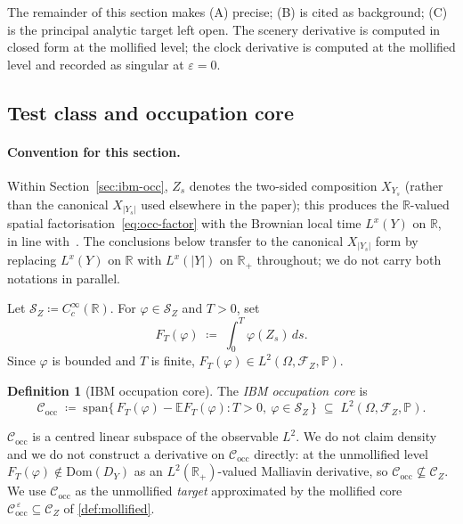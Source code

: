 \documentclass[11pt,reqno]{amsart}
\theoremstyle{plain}
\theoremstyle{definition}
\newtheorem{definition}[theorem]{Definition}
\theoremstyle{remark}
\newcommand{\R}{\mathbb{R}}
\newcommand{\E}{\mathbb{E}}
\newcommand{\Prob}{\mathbb{P}}
\newcommand{\Dom}{\mathrm{Dom}}
\newcommand{\IBM}{Z}
\begin{document}
The remainder of this section makes (A) precise; (B) is cited as
background; (C) is the principal analytic target left open. The
scenery derivative is computed in closed form at the mollified level;
the clock derivative is computed at the mollified level and recorded
as singular at $\varepsilon=0$.

\subsection*{Test class and occupation core}

\paragraph{Convention for this section.}
Within Section~\ref{sec:ibm-occ}, $\IBM_s$ denotes the two-sided
composition $X_{Y_s}$ (rather than the canonical
$X_{|Y_s|}$ used elsewhere in the paper); this produces the
$\R$-valued spatial factorisation~\eqref{eq:occ-factor} with the
Brownian local time $L^{x}(Y)$ on $\R$, in line
with~\cite{Fontes-IBMchaos}. The conclusions below transfer to the
canonical $X_{|Y_s|}$ form by replacing $L^{x}(Y)$ on $\R$ with
$L^{x}(|Y|)$ on $\R_{+}$ throughout; we do not carry both notations
in parallel.

Let $\mathscr S_\IBM\coloneqq C_c^{\infty}(\R)$. For
$\varphi\in\mathscr S_\IBM$ and $T>0$, set
\[
  F_T(\varphi)\;\coloneqq\;\int_0^T\varphi(\IBM_s)\,ds.
\]
Since $\varphi$ is bounded and $T$ is finite,
$F_T(\varphi)\in L^{2}(\Omega,\mathcal F_\IBM,\Prob)$.

\begin{definition}[IBM occupation core]\label{def:cocc}
The \emph{IBM occupation core} is
\[
  \mathcal C_{\mathrm{occ}}
  \;\coloneqq\;\mathrm{span}\bigl\{\,F_T(\varphi)-\E F_T(\varphi):
   T>0,\ \varphi\in\mathscr S_\IBM\,\bigr\}\;\subseteq\;
   L^{2}(\Omega,\mathcal F_\IBM,\Prob).
\]
\end{definition}

$\mathcal C_{\mathrm{occ}}$ is a centred linear subspace of the
observable $L^{2}$. We do not claim density and we do not construct a
derivative on $\mathcal C_{\mathrm{occ}}$ directly: at the unmollified
level $F_T(\varphi)\notin\Dom(D_Y)$ as an
$L^{2}(\R_{+})$-valued Malliavin derivative, so
$\mathcal C_{\mathrm{occ}}\not\subseteq\mathcal C_\IBM$. We use
$\mathcal C_{\mathrm{occ}}$ as the unmollified \emph{target}
approximated by the mollified core
$\mathcal C_{\mathrm{occ}}^{\,\varepsilon}\subseteq\mathcal C_\IBM$ of
\cref{def:mollified}.
\end{document}
